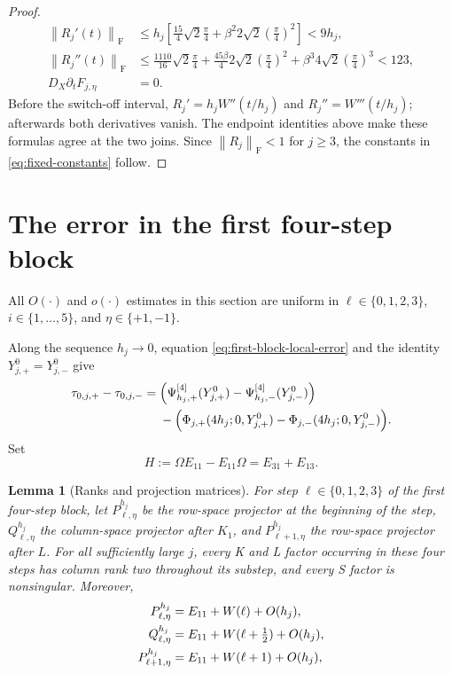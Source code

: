 \documentclass[10pt,a4paper]{amsart}
\numberwithin{equation}{section}
\newtheorem{lemma}[theorem]{Lemma}
\newcommand{\F}{\mathrm F}
\newcommand{\norm}[1]{\left\lVert #1\right\rVert}
\begin{document}
\begin{proof}
\begin{align*}
 \norm{R_j'(t)}_{\F}
 &\le h_j\left[
 \frac{15}{4}\sqrt2\frac\pi4
 +\beta^2 2\sqrt2\left(\frac\pi4\right)^2\right]
 <9h_j,\\
 \norm{R_j''(t)}_{\F}
 &\le \frac{1110}{16}\sqrt2\frac\pi4
 +\frac{45\beta}{4}2\sqrt2\left(\frac\pi4\right)^2
 +\beta^3 4\sqrt2\left(\frac\pi4\right)^3
 <123,\\
 D_X\partial_tF_{j,\eta}&=0.
\end{align*}
Before the switch-off interval,
$R_j'=h_jW''(t/h_j)$ and $R_j''=W'''(t/h_j)$; afterwards both
derivatives vanish.  The endpoint identities above make these formulas
agree at the two joins.
Since $\norm{R_j}_{\F}<1$ for $j\ge3$, the constants in
\eqref{eq:fixed-constants} follow.
\end{proof}

\section{The error in the first four-step block}
\label{sec:defect}

All $O(\cdot)$ and $o(\cdot)$ estimates in this section are uniform in
$\ell\in\{0,1,2,3\}$, $i\in\{1,\ldots,5\}$, and
$\eta\in\{+1,-1\}$.

Along the sequence $h_j\to0$, equation
\eqref{eq:first-block-local-error} and the identity
$Y^0_{j,+}=Y^0_{j,-}$ give
\begin{equation}\label{eq:tau-difference-decomposition}
\begin{aligned}
 \tau_{0,j,+}-\tau_{0,j,-}
 ={}&\Bigl(\Psi^{[4]}_{h_j,+}(Y_{j,+}^0)
           -\Psi^{[4]}_{h_j,-}(Y_{j,-}^0)\Bigr)\\
 &-\Bigl(\Phi_{j,+}(4h_j;0,Y_{j,+}^0)
          -\Phi_{j,-}(4h_j;0,Y_{j,-}^0)\Bigr).
\end{aligned}
\end{equation}
Set
\begin{equation}\label{eq:H-def}
 H:=\Omega E_{11}-E_{11}\Omega=E_{31}+E_{13}.
\end{equation}

\begin{lemma}[Ranks and projection matrices]
\label{lem:rank-projectors}
For step $\ell\in\{0,1,2,3\}$ of the first four-step block, let
$P^{h_j}_{\ell,\eta}$ be the row-space projector at the beginning of
the step, $Q^{h_j}_{\ell,\eta}$ the column-space projector after
$K_1$, and $P^{h_j}_{\ell+1,\eta}$ the row-space projector after $L$.
For all sufficiently large $j$, every K and L factor occurring in
these four steps has column rank two throughout its substep, and every
S factor is nonsingular.  Moreover,
\begin{align}
 P^{h_j}_{\ell,\eta}
 &=E_{11}+W(\ell)+O(h_j),\notag\\
 Q^{h_j}_{\ell,\eta}
 &=E_{11}+W(\ell+\tfrac12)+O(h_j),\notag\\
 P^{h_j}_{\ell+1,\eta}
 &=E_{11}+W(\ell+1)+O(h_j),
 \label{eq:projector-limits}
\end{align}
\end{lemma}
\end{document}
